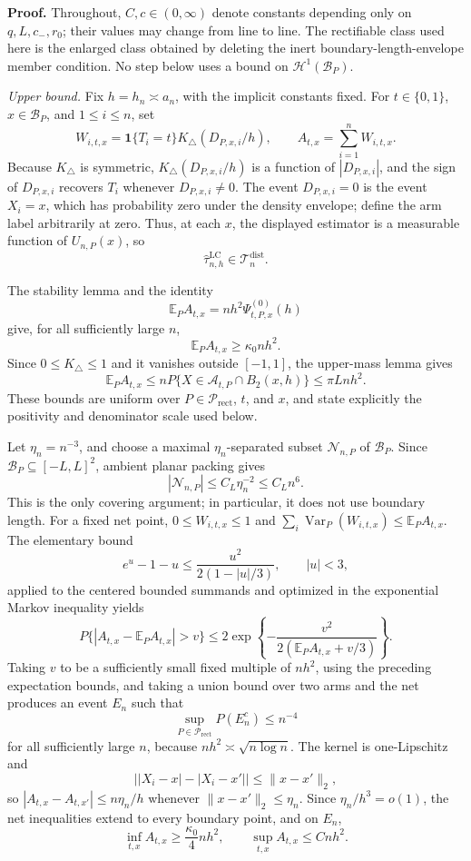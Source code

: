 \textbf{Proof.}
Throughout, \(C,c\in(0,\infty)\) denote constants depending only on \(q,L,c_{-},r_0\); their values may change from line to line.  The rectifiable class used here is the enlarged class obtained by deleting the inert boundary-length-envelope member condition.  No step below uses a bound on \(\mathcal H^1(\mathcal B_P)\).

\emph{Upper bound.}
Fix \(h=h_n\asymp a_n\), with the implicit constants fixed.  For \(t\in\{0,1\}\), \(x\in\mathcal B_P\), and \(1\leq i\leq n\), set
\[
 W_{i,t,x}=\mathbf 1\{T_i=t\}K_\triangle(D_{P,x,i}/h),
 \qquad
 A_{t,x}=\sum_{i=1}^n W_{i,t,x}.
\]
Because \(K_\triangle\) is symmetric, \(K_\triangle(D_{P,x,i}/h)\) is a function of \(|D_{P,x,i}|\), and the sign of \(D_{P,x,i}\) recovers \(T_i\) whenever \(D_{P,x,i}\ne0\).  The event \(D_{P,x,i}=0\) is the event \(X_i=x\), which has probability zero under the density envelope; define the arm label arbitrarily at zero.  Thus, at each \(x\), the displayed estimator is a measurable function of \(U_{n,P}(x)\), so
\[
 \widehat\tau^{\mathrm{LC}}_{n,h}\in\mathcal T_n^{\mathrm{dist}}.
\]

The stability lemma and the identity
\[
 \mathbb E_P A_{t,x}
 =nh^2\Psi^{(0)}_{t,P,x}(h)
\]
give, for all sufficiently large \(n\),
\[
 \mathbb E_P A_{t,x}\geq \kappa_0nh^2.
\]
Since \(0\leq K_\triangle\leq1\) and it vanishes outside \([-1,1]\), the upper-mass lemma gives
\[
 \mathbb E_P A_{t,x}
 \leq nP\{X\in\mathcal A_{t,P}\cap B_2(x,h)\}
 \leq \pi Lnh^2.
\]
These bounds are uniform over \(P\in\mathcal P_{\mathrm{rect}}\), \(t\), and \(x\), and state explicitly the positivity and denominator scale used below.

Let \(\eta_n=n^{-3}\), and choose a maximal \(\eta_n\)-separated subset \(\mathcal N_{n,P}\) of \(\mathcal B_P\).  Since \(\mathcal B_P\subseteq[-L,L]^2\), ambient planar packing gives
\[
 |\mathcal N_{n,P}|\leq C_L\eta_n^{-2}\leq C_Ln^6.
\]
This is the only covering argument; in particular, it does not use boundary length.  For a fixed net point, \(0\leq W_{i,t,x}\leq1\) and \(\sum_i\operatorname{Var}_P(W_{i,t,x})\leq\mathbb E_PA_{t,x}\).  The elementary bound
\[
 e^u-1-u\leq \frac{u^2}{2(1-|u|/3)},\qquad |u|<3,
\]
applied to the centered bounded summands and optimized in the exponential Markov inequality yields
\[
 P\{|A_{t,x}-\mathbb E_PA_{t,x}|>v\}
 \leq2\exp\!\left\{-\frac{v^2}{2(\mathbb E_PA_{t,x}+v/3)}\right\}.
\]
Taking \(v\) to be a sufficiently small fixed multiple of \(nh^2\), using the preceding expectation bounds, and taking a union bound over two arms and the net produces an event \(E_n\) such that
\[
 \sup_{P\in\mathcal P_{\mathrm{rect}}}P(E_n^c)\leq n^{-4}
\]
for all sufficiently large \(n\), because \(nh^2\asymp\sqrt{n\log n}\).  The kernel is one-Lipschitz and
\[
 \bigl||X_i-x|-|X_i-x'|\bigr|\leq\lVert x-x'\rVert_2,
\]
so \(|A_{t,x}-A_{t,x'}|\leq n\eta_n/h\) whenever \(\lVert x-x'\rVert_2\leq\eta_n\).  Since \(\eta_n/h^3=o(1)\), the net inequalities extend to every boundary point, and on \(E_n\),
\[
 \inf_{t,x}A_{t,x}\geq \frac{\kappa_0}{4}nh^2,
 \qquad
 \sup_{t,x}A_{t,x}\leq Cnh^2.
\]

